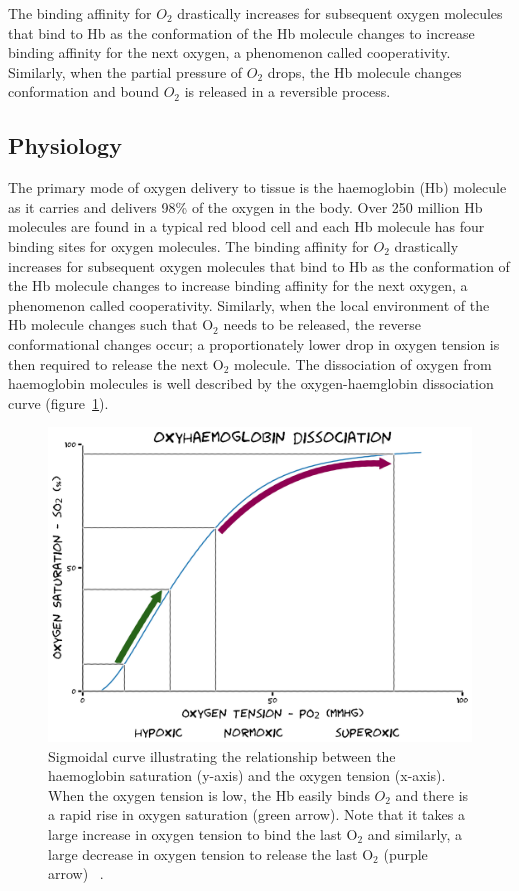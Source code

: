 The binding affinity for ${O_2}$ drastically increases for subsequent oxygen molecules that bind to \acs{Hb} as the conformation of the \acs{Hb} molecule changes to increase binding affinity for the next oxygen, a phenomenon called cooperativity. 
Similarly, when the partial pressure of ${O_2}$ drops, the \acs{Hb} molecule changes conformation  and bound ${O_2}$ is released in a reversible process.

\subsection{Physiology}

The primary mode of oxygen delivery to tissue is the haemoglobin (\acs{Hb}) molecule as it carries and delivers 98\% of the oxygen in the body. 
Over 250 million \acs{Hb} molecules are found in a typical red blood cell and each \acs{Hb} molecule has four binding sites for oxygen molecules. 
The binding affinity for ${O_2}$ drastically increases for subsequent oxygen molecules that bind to \acs{Hb} as the conformation of the \acs{Hb} molecule changes to increase binding affinity for the next oxygen, a phenomenon called cooperativity. 
Similarly, when the local environment of the \acs{Hb} molecule changes such that O$_2$ needs to be released, the reverse conformational changes occur; a proportionately lower drop in oxygen tension is then required to release the next O$_2$ molecule. 
The dissociation of oxygen from haemoglobin molecules is well described by the oxygen-haemglobin dissociation curve (figure~\ref{HBdis}).

\begin{figure}
 \includegraphics[width=\textwidth]{./oemri_thesis1/oemri_thesis1-images/Hbdissociation.png}
 \caption{Sigmoidal curve illustrating the relationship between the haemoglobin saturation (y-axis) and the oxygen tension (x-axis). When the oxygen tension is low, the Hb easily binds $O_2$ and there is a rapid rise in oxygen saturation (green arrow). Note that it takes a large increase in oxygen tension to bind the last O$_2$ and similarly, a large decrease in oxygen tension to release the last O$_2$ (purple arrow) ~\cite{GomezCambronero:2001hu}.}
 \label{HBdis}
\end{figure}	

